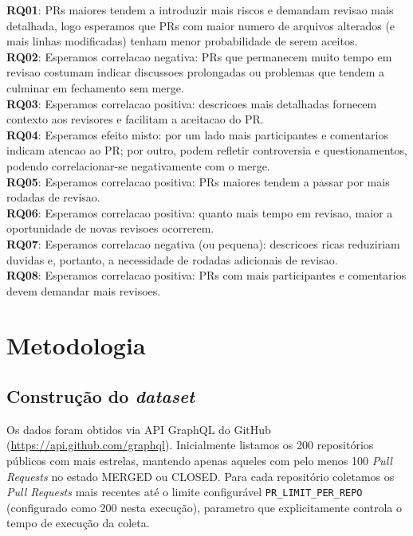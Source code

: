 \documentclass[11pt,a4paper]{article}
\begin{document}
\medskip
\textbf{RQ01}: PRs maiores tendem a introduzir mais riscos e demandam revisao mais detalhada, logo esperamos que PRs com maior numero de arquivos alterados (e mais linhas modificadas) tenham menor probabilidade de serem aceitos.\\
\textbf{RQ02}: Esperamos correlacao negativa: PRs que permanecem muito tempo em revisao costumam indicar discussoes prolongadas ou problemas que tendem a culminar em fechamento sem merge.\\
\textbf{RQ03}: Esperamos correlacao positiva: descricoes mais detalhadas fornecem contexto aos revisores e facilitam a aceitacao do PR.\\
\textbf{RQ04}: Esperamos efeito misto: por um lado mais participantes e comentarios indicam atencao ao PR; por outro, podem refletir controversia e questionamentos, podendo correlacionar-se negativamente com o merge.\\
\textbf{RQ05}: Esperamos correlacao positiva: PRs maiores tendem a passar por mais rodadas de revisao.\\
\textbf{RQ06}: Esperamos correlacao positiva: quanto mais tempo em revisao, maior a oportunidade de novas revisoes ocorrerem.\\
\textbf{RQ07}: Esperamos correlacao negativa (ou pequena): descricoes ricas reduziriam duvidas e, portanto, a necessidade de rodadas adicionais de revisao.\\
\textbf{RQ08}: Esperamos correlacao positiva: PRs com mais participantes e comentarios devem demandar mais revisoes.

\section{Metodologia}

\subsection*{Constru\c{c}\~ao do \emph{dataset}}

Os dados foram obtidos via API GraphQL do GitHub (\url{https://api.github.com/graphql}).
Inicialmente listamos os 200 reposit\'orios p\'ublicos com mais estrelas, mantendo apenas
aqueles com pelo menos 100 \emph{Pull Requests} no estado MERGED ou CLOSED. Para cada
reposit\'orio coletamos os \emph{Pull Requests} mais recentes at\'e o limite configur\'avel
\texttt{PR\_LIMIT\_PER\_REPO} (configurado como 200 nesta execu\c{c}\~ao), parametro que
explicitamente controla o tempo de execu\c{c}\~ao da coleta.
\end{document}
